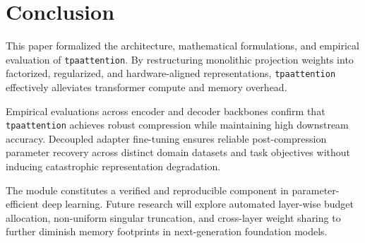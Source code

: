 \section{Conclusion}
This paper formalized the architecture, mathematical formulations, and empirical evaluation of \texttt{tpaattention}. By restructuring monolithic projection weights into factorized, regularized, and hardware-aligned representations, \texttt{tpaattention} effectively alleviates transformer compute and memory overhead.

Empirical evaluations across encoder and decoder backbones confirm that \texttt{tpaattention} achieves robust compression while maintaining high downstream accuracy. Decoupled adapter fine-tuning ensures reliable post-compression parameter recovery across distinct domain datasets and task objectives without inducing catastrophic representation degradation.

The module constitutes a verified and reproducible component in parameter-efficient deep learning. Future research will explore automated layer-wise budget allocation, non-uniform singular truncation, and cross-layer weight sharing to further diminish memory footprints in next-generation foundation models.

